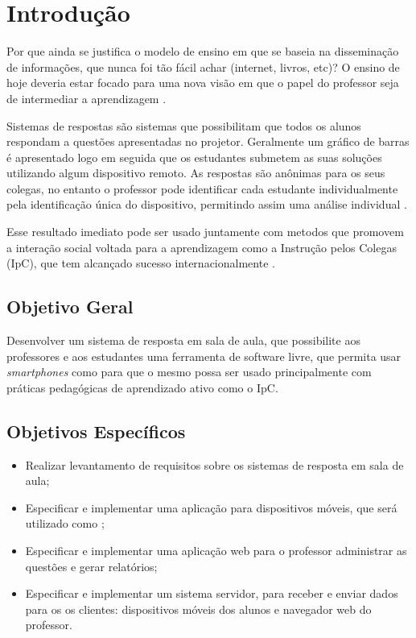 \chapter{Introdução}

Por que ainda se justifica o modelo de ensino em que se baseia
na disseminação de informações, que nunca foi tão fácil achar (internet,
livros, etc)? O ensino de hoje deveria estar focado para uma nova
visão em que o papel do professor seja de intermediar a aprendizagem \cite[p. 19]{Araujo2013}.

Sistemas de respostas são sistemas que possibilitam que todos os alunos
respondam a questões apresentadas no projetor. Geralmente um gráfico de barras
é apresentado logo em seguida que os estudantes submetem as suas soluções
utilizando algum dispositivo remoto. As respostas são anônimas para os seus colegas,
no entanto o professor pode identificar cada estudante individualmente pela
identificação única do dispositivo, permitindo assim uma análise individual \cite[p. 1]{Kay2009}.


Esse resultado imediato pode ser usado juntamente
com metodos que promovem a interação social voltada para a aprendizagem como a
Instrução pelos Colegas (IpC), que tem alcançado sucesso internacionalmente \cite[p. 3]{Araujo2013}.

\section{Objetivo Geral}
Desenvolver um sistema de resposta em sala de aula,
que possibilite aos professores e aos estudantes uma ferramenta de software livre,
que permita usar {\textit{smartphones}} como {\clickers} para que o mesmo possa
ser usado principalmente com práticas pedagógicas de aprendizado ativo como o IpC.

\section{Objetivos Específicos}

\begin{itemize}
    \item Realizar levantamento de requisitos sobre os sistemas de resposta em sala de aula;
    \item Especificar e implementar uma aplicação para dispositivos móveis, que será utilizado como {\clickers};
    \item Especificar e implementar uma aplicação web para o professor administrar as questões e gerar relatórios;
    \item Especificar e implementar um sistema servidor, para receber e
    enviar dados para os os clientes: dispositivos móveis dos alunos e navegador
    web do professor.
\end{itemize}

